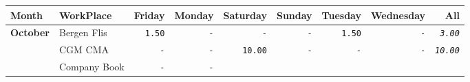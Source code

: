 \documentclass[11pt,A4paper,]{article}
\begin{document}
\begin{longtable}[]{@{}llrrrrrrr@{}}
\toprule
Month & WorkPlace & Friday & Monday & Saturday & Sunday & Tuesday &
Wednesday & All\tabularnewline
\midrule
\endhead
\textbf{October} & Bergen Flis & \texttt{1.50} & \texttt{-} & \texttt{-}
& \texttt{-} & \texttt{1.50} & \texttt{-} &
\emph{\texttt{3.00}}\tabularnewline
\begin{minipage}[t]{0.11\columnwidth}\raggedright\strut
\strut
\end{minipage} & \begin{minipage}[t]{0.11\columnwidth}\raggedright\strut
CGM CMA\strut
\end{minipage} & \begin{minipage}[t]{0.11\columnwidth}\raggedleft\strut
\texttt{-}\strut
\end{minipage} & \begin{minipage}[t]{0.11\columnwidth}\raggedleft\strut
\texttt{-}\strut
\end{minipage} & \begin{minipage}[t]{0.11\columnwidth}\raggedleft\strut
\texttt{10.00}\strut
\end{minipage} & \begin{minipage}[t]{0.11\columnwidth}\raggedleft\strut
\texttt{-}\strut
\end{minipage} & \begin{minipage}[t]{0.11\columnwidth}\raggedleft\strut
\texttt{-}\strut
\end{minipage} & \begin{minipage}[t]{0.11\columnwidth}\raggedleft\strut
\texttt{-}\strut
\end{minipage} & \begin{minipage}[t]{0.11\columnwidth}\raggedleft\strut
\emph{\texttt{10.00}}\strut
\end{minipage}\tabularnewline
\begin{minipage}[t]{0.11\columnwidth}\raggedright\strut
\strut
\end{minipage} & \begin{minipage}[t]{0.11\columnwidth}\raggedright\strut
Company Book\strut
\end{minipage} & \begin{minipage}[t]{0.11\columnwidth}\raggedleft\strut
\texttt{-}\strut
\end{minipage} & \begin{minipage}[t]{0.11\columnwidth}\raggedleft\strut
\texttt{-}\strut
\end{minipage} & \begin{minipage}[t]{0.11\columnwidth}\raggedleft\strut

\end{minipage}
\end{longtable}
\end{document}
